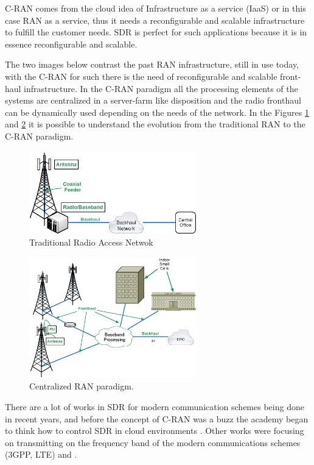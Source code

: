 C-RAN comes from the cloud idea of Infrastructure as a service (IaaS) or in this
case RAN as a service, thus it needs a reconfigurable and scalable
infrastructure to fulfill the customer needs. SDR is perfect for such
applications because  it is in essence reconfigurable and scalable.

The two images below contrast the past RAN infrastructure, still in use today,
with the C-RAN for such there is the need of reconfigurable and scalable
front-haul infrastructure. In the C-RAN paradigm all the processing elements of
the systems are centralized in a server-farm like disposition and the radio fronthaul
can be dynamically used depending on the needs of the network. In the Figures
\ref{fig:tran} and \ref{fig:cran} it is possible to understand the evolution
from the traditional RAN to the C-RAN paradigm.

\begin{figure}[htbp]
    \centering
    \includegraphics[width=0.65\textwidth]{./figures/traditional_bs}
    \caption{ Traditional Radio Access Netwok
    \label{fig:tran}}
\end{figure}

\begin{figure}[htbp]
    \centering
    \includegraphics[width=0.65\textwidth]{./figures/c_RAN}
    \caption{ Centralized RAN paradigm.
    \label{fig:cran}}
\end{figure}

There are a lot of works in SDR for modern communication schemes being done in
recent years, and before the concept of C-RAN was a buzz the academy began to
think how to control SDR in cloud environments \cite{dayananda2012}. Other
works were focusing on transmitting on the frequency band of the modern
communications schemes (3GPP, LTE) \cite{kelley2009} and \cite{neenu2014}.

